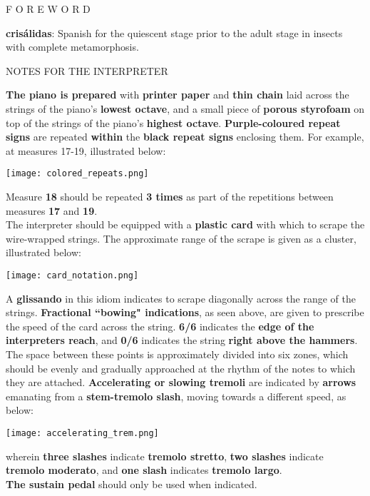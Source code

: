 \documentclass[12pt]{article}
\newcommand*\circled[1]{\tikz[baseline=(char.base)]{
            \node[shape=circle,draw,inner sep=1pt] (char) {#1};}}
\begin{document}
\begingroup
\begin{center}
\huge F O R E W O R D
\end{center}
\endgroup

\begingroup
\begin{center}
\textbf{crisálidas}: Spanish for the quiescent stage prior to the adult stage in insects with complete metamorphosis.
\end{center}
\endgroup

\vspace{1\baselineskip}

\begingroup
\begin{center}
\huge NOTES FOR THE INTERPRETER
\end{center}
\endgroup

\begingroup
\textbf{\circled{1} The piano is prepared} with \textbf{printer paper} and \textbf{thin chain} laid across the strings of the piano's \textbf{lowest octave}, and a small piece of \textbf{porous styrofoam} on top of the strings of the piano's \textbf{highest octave}. \textbf{\circled{2} Purple-coloured repeat signs} are repeated \textbf{within} the \textbf{black repeat signs} enclosing them. For example, at measures 17-19, illustrated below: \\
\begin{center}
\texttt{[image: colored\_repeats.png]}\\
\end{center}
Measure \textbf{18} should be repeated \textbf{3 times} as part of the repetitions between measures \textbf{17} and \textbf{19}. \\
\textbf{\circled{3}} The interpreter should be equipped with a \textbf{plastic card} with which to scrape the wire-wrapped strings. The approximate range of the scrape is given as a cluster, illustrated below: \\
\begin{center}
\texttt{[image: card\_notation.png]}\\
\end{center} 
A \textbf{glissando} in this idiom indicates to scrape diagonally across the range of the strings. \textbf{\circled{4} Fractional ``bowing" indications}, as seen above, are given to prescribe the speed of the card across the string. \textbf{6/6} indicates the \textbf{edge of the interpreters reach}, and \textbf{0/6} indicates the string \textbf{right above the hammers}. The space between these points is approximately divided into six zones, which should be evenly and gradually approached at the rhythm of the notes to which they are attached. \textbf{\circled{5} Accelerating or slowing tremoli} are indicated by \textbf{arrows} emanating from a \textbf{stem-tremolo slash}, moving towards a different speed, as below: \\
\begin{center}
\texttt{[image: accelerating\_trem.png]}\\
\end{center} 
wherein \textbf{three slashes} indicate \textbf{tremolo stretto}, \textbf{two slashes} indicate \textbf{tremolo moderato}, and \textbf{one slash} indicates \textbf{tremolo largo}. \\
\textbf{\circled{6} The sustain pedal} should only be used when indicated. 
\endgroup
\end{document}
